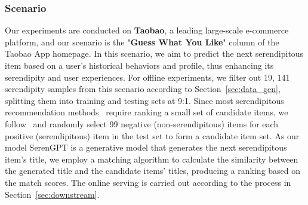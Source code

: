 
\subsubsection{Scenario} Our experiments are conducted on \textbf{Taobao}, a leading large-scale e-commerce platform, and our scenario is the "\textbf{Guess What You Like}" column of the Taobao App homepage. In this scenario, we aim to predict the next serendipitous item based on a user's historical behaviors and profile, thus enhancing its serendipity and user experiences. For offline experiments, we filter out 19, 141 serendipity samples from this scenario according to Section~\ref{sec:data_gen}, splitting them into training and testing sets at 9:1. Since most serendipitous recommendation methods~\cite{fu2024art,tokutake2024can} require ranking a small set of candidate items, we follow~\cite{fu2024art} and randomly select 99 negative (non-serendipitous) items for each positive (serendipitous) item in the test set to form a candidate item set. As our model SerenGPT is a generative model that generates the next serendipitous item's title, we employ a matching algorithm to calculate the similarity between the generated title and the candidate items' titles, producing a ranking based on the match scores. The online serving is carried out according to the process in Section~\ref{sec:downstream}.


